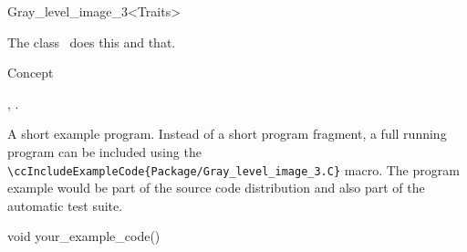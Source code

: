 

\begin{ccRefClass}{Gray_level_image_3<Traits>}  %


\ccDefinition
  
The class \ccRefName\ does this and that.


\ccIsModel

Concept

\ccTypes


\ccCreation
{}  %


\ccOperations


\ccSeeAlso

,
.

\ccExample

A short example program.
Instead of a short program fragment, a full running program can be
included using the 
\verb|\ccIncludeExampleCode{Package/Gray_level_image_3.C}| 
macro. The program example would be part of the source code distribution and
also part of the automatic test suite.

\begin{ccExampleCode}
void your_example_code() {
}
\end{ccExampleCode}


\end{ccRefClass}


